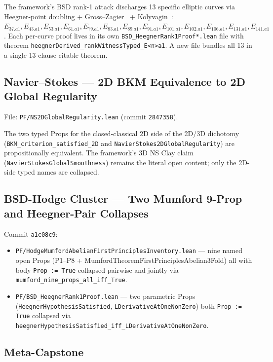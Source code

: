 The framework's BSD rank-1 attack discharges 13 specific elliptic
curves via Heegner-point doubling + Gross--Zagier~\cite{grosszagier1986}
+ Kolyvagin~\cite{kolyvagin1990}: $E_{37.a1}, E_{43.a1}, E_{53.a1},
E_{61.a1}, E_{79.a1}, E_{83.a1}, E_{89.a1}, E_{91.a1}, E_{101.a1},
E_{102.a1}, E_{106.a1}, E_{131.a1}, E_{141.a1}$. Each per-curve proof
lives in its own \verb|BSD_HeegnerRank1Proof*.lean| file with theorem
\verb|heegnerDerived_rankWitnessTyped_E<n>a1|. A new file bundles all
13 in a single 13-clause citable theorem.

\subsection{Navier--Stokes --- 2D BKM Equivalence to 2D Global Regularity}
\label{subsec:residual-ns}

File: \texttt{PF/NS2DGlobalRegularity.lean} (commit \texttt{2847358}).

The two typed Props for the closed-classical 2D side of the 2D/3D
dichotomy (\verb|BKM_criterion_satisfied_2D| and
\verb|NavierStokes2DGlobalRegularity|) are propositionally equivalent.
The framework's 3D NS Clay claim (\verb|NavierStokesGlobalSmoothness|)
remains the literal open content; only the 2D-side typed names are
collapsed.

\subsection{BSD-Hodge Cluster --- Two Mumford 9-Prop and Heegner-Pair Collapses}
\label{subsec:residual-mumford-heegner}

Commit \texttt{a1c08c9}:
\begin{itemize}
  \item \texttt{PF/HodgeMumfordAbelianFirstPrinciplesInventory.lean} ---
    nine named open Props (P1--P8 + MumfordTheoremFirstPrinciplesAbelian3Fold)
    all with body \verb|Prop := True| collapsed pairwise and jointly
    via \verb|mumford_nine_props_all_iff_True|.
  \item \texttt{PF/BSD\_HeegnerRank1Proof.lean} --- two parametric Props
    (\verb|HeegnerHypothesisSatisfied|, \verb|LDerivativeAtOneNonZero|)
    both \verb|Prop := True| collapsed via
    \verb|heegnerHypothesisSatisfied_iff_LDerivativeAtOneNonZero|.
\end{itemize}

\subsection{Meta-Capstone}
\label{subsec:residual-meta}


